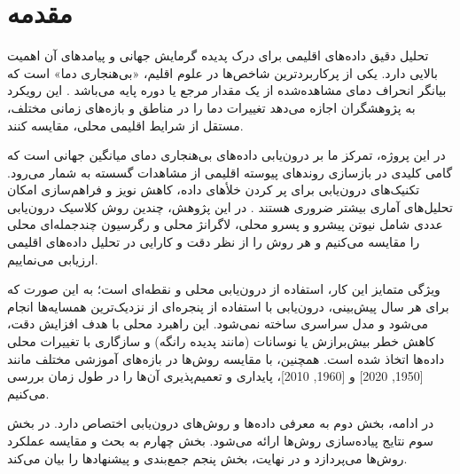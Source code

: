\section{مقدمه}

تحلیل دقیق داده‌های اقلیمی برای درک پدیده گرمایش جهانی و پیامدهای آن اهمیت بالایی دارد. یکی از پرکاربردترین شاخص‌ها در علوم اقلیم، «بی‌هنجاری دما» است که بیانگر انحراف دمای مشاهده‌شده از یک مقدار مرجع یا دوره پایه می‌باشد \cite{gistemp, hansen2010global}. این رویکرد به پژوهشگران اجازه می‌دهد تغییرات دما را در مناطق و بازه‌های زمانی مختلف، مستقل از شرایط اقلیمی محلی، مقایسه کنند.

در این پروژه، تمرکز ما بر درون‌یابی داده‌های بی‌هنجاری دمای میانگین جهانی است که گامی کلیدی در بازسازی روندهای پیوسته اقلیمی از مشاهدات گسسته به شمار می‌رود. تکنیک‌های درون‌یابی برای پر کردن خلأهای داده، کاهش نویز و فراهم‌سازی امکان تحلیل‌های آماری بیشتر ضروری هستند \cite{atkinson1989introduction, burden2011numerical}. در این پژوهش، چندین روش کلاسیک درون‌یابی عددی شامل نیوتن پیشرو و پسرو محلی، لاگرانژ محلی و رگرسیون چندجمله‌ای محلی را مقایسه می‌کنیم و هر روش را از نظر دقت و کارایی در تحلیل داده‌های اقلیمی ارزیابی می‌نماییم.

ویژگی متمایز این کار، استفاده از درون‌یابی محلی و نقطه‌ای است؛ به این صورت که برای هر سال پیش‌بینی، درون‌یابی با استفاده از پنجره‌ای از نزدیک‌ترین همسایه‌ها انجام می‌شود و مدل سراسری ساخته نمی‌شود. این راهبرد محلی با هدف افزایش دقت، کاهش خطر بیش‌برازش یا نوسانات (مانند پدیده رانگه) و سازگاری با تغییرات محلی داده‌ها اتخاذ شده است. همچنین، با مقایسه روش‌ها در بازه‌های آموزشی مختلف مانند [1950, 2020] و [1960, 2010]، پایداری و تعمیم‌پذیری آن‌ها را در طول زمان بررسی می‌کنیم.

در ادامه، بخش دوم به معرفی داده‌ها و روش‌های درون‌یابی اختصاص دارد. در بخش سوم نتایج پیاده‌سازی روش‌ها ارائه می‌شود. بخش چهارم به بحث و مقایسه عملکرد روش‌ها می‌پردازد و در نهایت، بخش پنجم جمع‌بندی و پیشنهادها را بیان می‌کند.
